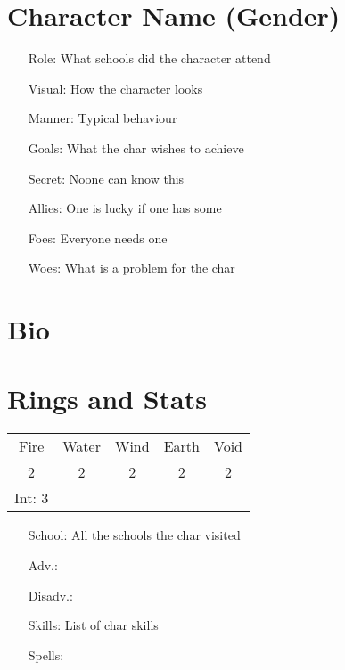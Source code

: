 \documentclass[10pt]{article}
\begin{document}

\section*{Character Name (Gender)}

\begin{itemize}
  \item[Role:] What schools did the character attend
  \item[Visual:] How the character looks
  \item[Manner:] Typical behaviour
  \item[Goals:]  What the char wishes to achieve
  \item[Secret:] Noone can know this
  \item[Allies:] One is lucky if one has some
  \item[Foes:]   Everyone needs one
  \item[Woes:]   What is a problem for the char
\end{itemize}

\section*{Bio}

\lipsum[1]

\section*{Rings and Stats}
\begin{center}
  \begin{tabular}{ c c c c c }
    Fire & Water & Wind & Earth & Void \\
    2 & 2 & 2 & 2 & 2 \\
    Int: 3 & & & & \\
  \end{tabular}
\end{center}

\begin{itemize}
  \item[School:] All the schools the char visited
  \item[Adv.:]
  \item[Disadv.:]
  \item[Skills:] List of char skills
  \item[Spells:]
\end{itemize}
\end{document}
